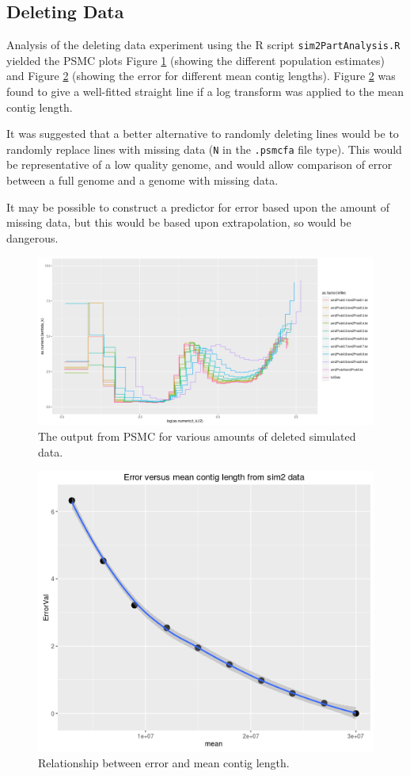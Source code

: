 \documentclass[11pt,a4paper]{article}
\begin{document}
\subsection{Deleting Data}
Analysis of the deleting data experiment using the R script \verb|sim2PartAnalysis.R| yielded the PSMC plots Figure \ref{deletedDataPsmcPlots} (showing the different population estimates) and Figure \ref{sim2ErrorVsMeanContigLength} (showing the error for different mean contig lengths). Figure \ref{sim2ErrorVsMeanContigLength} was found to give a well-fitted straight line if a log transform was applied to the mean contig length.

It was suggested that a better alternative to randomly deleting lines would be to randomly replace lines with missing data (\verb|N| in the \verb|.psmcfa| file type). This would be representative of a low quality genome, and would allow comparison of error between a full genome and a genome with missing data.

It may be possible to construct a predictor for error based upon the amount of missing data, but this would be based upon extrapolation, so would be dangerous.

\begin{figure}[h]
  \center
  \includegraphics[width=1\linewidth]{figures/deletedDataPsmcPlots.png}
  \caption{The output from PSMC for various amounts of deleted simulated data.}\label{deletedDataPsmcPlots}
\end{figure}

\begin{figure}[h]
  \center
  \includegraphics[width=.7\linewidth]{figures/sim2ErrorVsMeanContigLength.png}
  \caption{Relationship between error and mean contig length.}\label{sim2ErrorVsMeanContigLength}
\end{figure}
\end{document}
